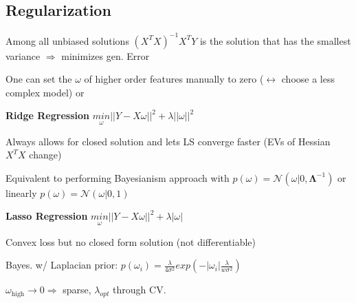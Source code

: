 \subsection{Regularization}

Among all unbiased solutions $(X^TX)^{-1}X^TY$ is the solution that has the smallest variance $\Rightarrow$ minimizes gen. Error

One can set the $\omega$ of higher order features manually to zero ($\leftrightarrow$ choose a less complex model) or

\textbf{Ridge Regression} $\underset{\omega}{min}||Y-X\omega||^2 + \lambda||\omega||^2$

Always allows for closed solution and lets LS converge faster (EVs of Hessian $X^TX$ change)

Equivalent to performing Bayesianism approach with $p(\omega) = \mathcal{N}(\omega|0,\boldsymbol{\Lambda}^{-1})$ or linearly $p(\omega) = \mathcal{N}(\omega|0,1)$

\textbf{Lasso Regression} $\underset{\omega}{min}||Y-X\omega||^2 + \lambda|\omega|$ 

Convex loss  but no closed form solution (not differentiable)

Bayes. w/ Laplacian prior:  $p(\omega_i) = \frac{\lambda}{4\sigma^2}exp(-|\omega_i|\frac{\lambda}{w\sigma^2})$

$\omega_{\text{high}} \rightarrow 0 \Rightarrow$ sparse, $\lambda_{opt}$ through CV.



